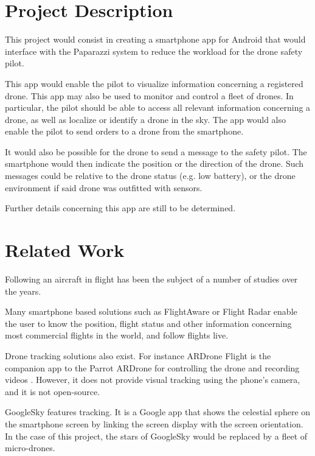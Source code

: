 \documentclass[10pt,letterpaper]{article}
\begin{document}
\section{Project Description}
This project would consist in creating a smartphone app for Android that would interface with the Paparazzi system to reduce the workload for the drone safety pilot. 

This app would enable the pilot to visualize information concerning a registered drone. This app may also be used to monitor and control a fleet of drones. In particular, the pilot should be able to access all relevant information concerning a drone, as well as localize or identify a drone in the sky. The app would also enable the pilot to send orders to a drone from the smartphone. 

It would also be possible for the drone to send a message to the safety pilot. The smartphone would then indicate the position or the direction of the drone. Such messages could be relative to the drone status (e.g. low battery), or the drone environment if said drone was outfitted with sensors. 

Further details concerning this app are still to be determined. 

\section{Related Work}
Following an aircraft in flight has been the subject of a number of studies over the years. 

Many smartphone based solutions such as FlightAware \cite{FlightAware} or Flight Radar \cite{FlightRadar24} enable the user to know the position, flight status and other information concerning most commercial flights in the world, and follow flights live. 

Drone tracking solutions also exist. For instance ARDrone Flight is the companion app to the Parrot ARDrone for controlling the drone and recording videos \cite{ARDroneFlight,ARDrone}. However, it does not provide visual tracking using the phone's camera, and it is not open-source. 

GoogleSky \cite{GoogleSky} features tracking. It is a Google app that shows  the celestial sphere on the smartphone screen by linking the screen display with the screen orientation. In the case of this project, the stars of GoogleSky would be replaced by a fleet of micro-drones. 
\end{document}
